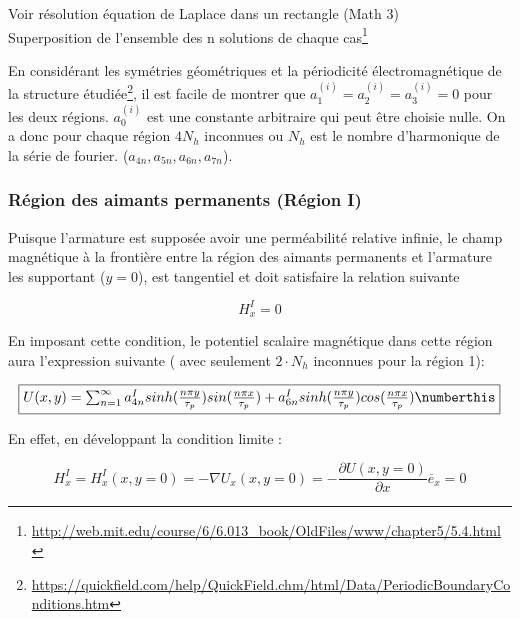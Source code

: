 \begin{center}
    Voir résolution équation de Laplace dans un rectangle (Math 3)\\ Superposition de l'ensemble des n solutions de chaque cas\footnote{\url{http://web.mit.edu/course/6/6.013_book/OldFiles/www/chapter5/5.4.html}}\\
\end{center}
En considérant les symétries géométriques et la périodicité électromagnétique de la structure étudiée\footnote{\url{https://quickfield.com/help/QuickField.chm/html/Data/PeriodicBoundaryConditions.htm}}, il est facile de montrer que $a_1^{(i)}=a_2^{(i)}=a_3^{(i)}=0$ pour les deux régions. $a_0^{(i)}$ est une constante arbitraire qui peut être choisie nulle. On a donc pour chaque région $4N_h$ inconnues ou $N_h$ est le nombre d'harmonique de la série de fourier. ($a_{4n},a_{5n},a_{6n},a_{7n}$).


\subsubsection{Région des aimants permanents (Région I)}
Puisque l'armature est supposée avoir une perméabilité relative infinie, le champ magnétique à la frontière entre la région des aimants permanents et l'armature les supportant ($y=0$), est tangentiel et doit satisfaire la relation suivante

\begin{equation}
    H_x^I=0
\end{equation}

En imposant cette condition, le potentiel scalaire magnétique dans cette région aura l'expression suivante ( avec seulement $2\cdot N_h$ inconnues pour la région 1):

\begin{equation}
\fbox{$
    U(x,y) = \sum_{n=1}^\infty a_{4n}^Isinh(\frac{n\pi y}{\tau_p})sin(\frac{n\pi x}{\tau_p})\\
    + a_{6n}^Isinh(\frac{n\pi y}{\tau_p})cos(\frac{n\pi x}{\tau_p})\numberthis
$}
\end{equation}

En effet, en développant la condition limite :

\begin{equation}
    H_x^I = H_x^I(x,y=0) = -\nabla U_x(x,y=0) = -\frac{\partial U(x,y=0)}{\partial x}\overline{e}_x = 0
\end{equation}

